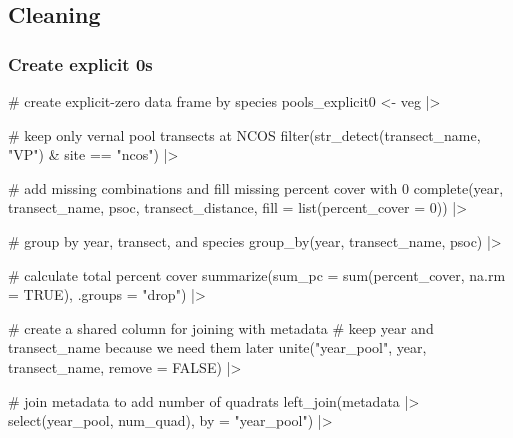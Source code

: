 \documentclass[
  letterpaper,
  DIV=11,
  numbers=noendperiod]{scrartcl}
\newenvironment{Shaded}{\begin{snugshade}}{\end{snugshade}}
\newcommand{\AttributeTok}[1]{\textcolor[rgb]{0.40,0.45,0.13}{#1}}
\newcommand{\CommentTok}[1]{\textcolor[rgb]{0.37,0.37,0.37}{#1}}
\newcommand{\ConstantTok}[1]{\textcolor[rgb]{0.56,0.35,0.01}{#1}}
\newcommand{\DecValTok}[1]{\textcolor[rgb]{0.68,0.00,0.00}{#1}}
\newcommand{\FunctionTok}[1]{\textcolor[rgb]{0.28,0.35,0.67}{#1}}
\newcommand{\NormalTok}[1]{\textcolor[rgb]{0.00,0.23,0.31}{#1}}
\newcommand{\OtherTok}[1]{\textcolor[rgb]{0.00,0.23,0.31}{#1}}
\newcommand{\SpecialCharTok}[1]{\textcolor[rgb]{0.37,0.37,0.37}{#1}}
\newcommand{\StringTok}[1]{\textcolor[rgb]{0.13,0.47,0.30}{#1}}
\begin{document}
\subsection{Cleaning}\label{cleaning}

\subsubsection{Create explicit 0s}\label{create-explicit-0s}

\begin{Shaded}
\begin{Highlighting}[]
\CommentTok{\# create explicit{-}zero data frame by species}
\NormalTok{pools\_explicit0 }\OtherTok{\textless{}{-}}\NormalTok{ veg }\SpecialCharTok{|\textgreater{}} 
  
  \CommentTok{\# keep only vernal pool transects at NCOS}
  \FunctionTok{filter}\NormalTok{(}\FunctionTok{str\_detect}\NormalTok{(transect\_name, }\StringTok{"VP"}\NormalTok{) }\SpecialCharTok{\&}
\NormalTok{           site }\SpecialCharTok{==} \StringTok{"ncos"}\NormalTok{) }\SpecialCharTok{|\textgreater{}} 
  
  \CommentTok{\# add missing combinations and fill missing percent cover with 0}
  \FunctionTok{complete}\NormalTok{(year,}
\NormalTok{           transect\_name,}
\NormalTok{           psoc,}
\NormalTok{           transect\_distance,}
           \AttributeTok{fill =} \FunctionTok{list}\NormalTok{(}\AttributeTok{percent\_cover =} \DecValTok{0}\NormalTok{)) }\SpecialCharTok{|\textgreater{}} 
  
  \CommentTok{\# group by year, transect, and species}
  \FunctionTok{group\_by}\NormalTok{(year, transect\_name, psoc) }\SpecialCharTok{|\textgreater{}} 
  
  \CommentTok{\# calculate total percent cover}
  \FunctionTok{summarize}\NormalTok{(}\AttributeTok{sum\_pc =} \FunctionTok{sum}\NormalTok{(percent\_cover, }\AttributeTok{na.rm =} \ConstantTok{TRUE}\NormalTok{),}
            \AttributeTok{.groups =} \StringTok{"drop"}\NormalTok{) }\SpecialCharTok{|\textgreater{}} 
  
  \CommentTok{\# create a shared column for joining with metadata}
  \CommentTok{\# keep year and transect\_name because we need them later}
  \FunctionTok{unite}\NormalTok{(}\StringTok{"year\_pool"}\NormalTok{,}
\NormalTok{        year,}
\NormalTok{        transect\_name,}
        \AttributeTok{remove =} \ConstantTok{FALSE}\NormalTok{) }\SpecialCharTok{|\textgreater{}} 
  
  \CommentTok{\# join metadata to add number of quadrats}
  \FunctionTok{left\_join}\NormalTok{(metadata }\SpecialCharTok{|\textgreater{}}
              \FunctionTok{select}\NormalTok{(year\_pool, num\_quad),}
            \AttributeTok{by =} \StringTok{"year\_pool"}\NormalTok{) }\SpecialCharTok{|\textgreater{}} 
  

\end{Highlighting}
\end{Shaded}
\end{document}

